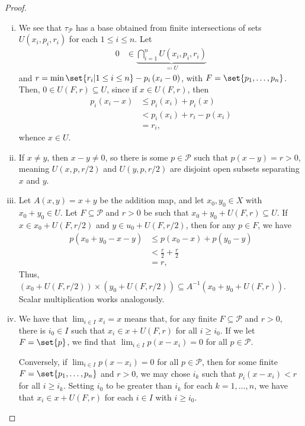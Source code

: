 \documentclass[10pt]{mypackage}
\begin{document}
\begin{proof}\hfill
  \begin{enumerate}[(i)]
    \item We see that $\tau_{\mathcal{P}}$ has a base obtained from finite intersections of sets $U\left( x_i,p_i,r_i \right)$ for each $1 \leq i \leq n$. Let
      \begin{align*}
        0 &\in \underbrace{\bigcap_{i=1}^{n}U\left( x_i,p_i,r_i \right)}_{\eqcolon U}
      \end{align*}
      and $r = \min\set{r_i | 1\leq i \leq n} - p_i\left( x_i-0 \right)$, with $F = \set{p_1,\dots,p_n}$. Then, $0\in U\left( F,r \right)\subseteq U$, since if $x\in U\left( F,r \right)$, then
      \begin{align*}
        p_i\left( x_i-x \right) &\leq p_i\left( x_i \right) + p_i\left( x \right)\\
                                &< p_i\left( x_i \right) + r_i - p\left( x_i \right)\\
                                &= r_i,
      \end{align*}
      whence $x\in U$. 
    \item If $x\neq y$, then $x-y\neq 0$, so there is some $p\in \mathcal{P}$ such that $p\left( x-y \right) = r > 0$, meaning $U\left( x,p,r/2 \right)$ and $U\left( y,p,r/2 \right)$ are disjoint open subsets separating $x$ and $y$.
    \item Let $A\left( x,y \right) = x + y$ be the addition map, and let $x_0,y_0\in X$ with $x_0 + y_0\in U$. Let $F\subseteq \mathcal{P}$ and $r > 0$ be such that $x_0 + y_0 + U\left( F,r \right)\subseteq U$. If $x\in x_0 + U\left( F,r/2 \right)$ and $y\in u_0 + U\left( F,r/2 \right)$, then for any $p\in F$, we have
      \begin{align*}
        p\left( x_0 + y_0 - x - y \right) &\leq p\left( x_0 - x \right) + p\left( y_0 - y \right)\\
                                          &< \frac{r}{2} + \frac{r}{2}\\
                                          &= r,
      \end{align*}
      Thus, $\left( x_0 + U\left( F,r/2 \right) \right) \times \left( y_0 + U\left( F,r/2 \right) \right) \subseteq A^{-1}\left( x_0 + y_0 + U\left( F,r \right) \right)$. Scalar multiplication works analogously.
    \item We have that $\lim_{i\in I}x_i = x$ means that, for any finite $F\subseteq \mathcal{P}$ and $r > 0$, there is $i_0\in I$ such that $x_i\in x + U\left( F,r \right)$ for all $i\geq i_0$. If we let $F = \set{p}$, we find that $\lim_{i\in I}p\left( x-x_i \right) = 0$ for all $p\in \mathcal{P}$.

      Conversely, if $\lim_{i\in I}p\left( x-x_i \right) = 0$ for all $p\in \mathcal{P}$, then for some finite $F=\set{p_1,\dots,p_n}$ and $r > 0$, we may chose $i_k$ such that $p_i\left( x-x_i \right) < r$ for all $i\geq i_k$. Setting $i_0$ to be greater than $i_k$ for each $k=1,\dots,n$, we have that $x_i\in x + U\left( F,r \right)$ for each $i\in I$ with $i\geq i_0$.
  \end{enumerate}
\end{proof}
\end{document}
